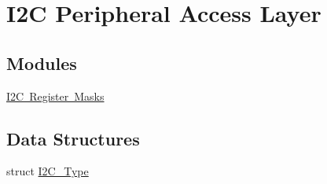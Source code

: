 \hypertarget{group___i2_c___peripheral___access___layer}{}\section{I2C Peripheral Access Layer}
\label{group___i2_c___peripheral___access___layer}
\subsection*{Modules}
\begin{DoxyCompactItemize}
\item 
\mbox{\hyperlink{group___i2_c___register___masks}{I2\+C Register Masks}}
\end{DoxyCompactItemize}
\subsection*{Data Structures}
\begin{DoxyCompactItemize}
\item 
struct \mbox{\hyperlink{struct_i2_c___type}{I2\+C\+\_\+\+Type}}
\end{DoxyCompactItemize}
